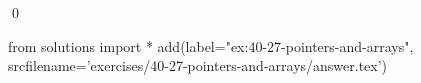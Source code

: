
\begin{ex}
  \label{ex:40-27-pointers-and-arrays}
  
  \qed
\end{ex}
\begin{python0}
from solutions import *
add(label="ex:40-27-pointers-and-arrays",
    srcfilename='exercises/40-27-pointers-and-arrays/answer.tex')
\end{python0}
